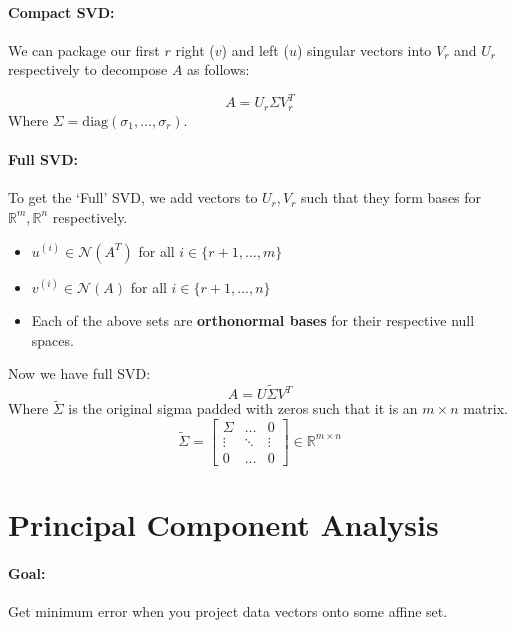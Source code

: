 \documentclass[a4paper,12pt]{report}
\def\reals{\mathbb{R}}
\begin{document}
\paragraph{Compact SVD: } We can package our first $r$ right ($v$) and left ($u$) singular vectors into $V_r$ and $U_r$ respectively to decompose $A$ as follows:

\begin{equation}
	A = U_r \Sigma V_r^T
\end{equation}
Where $\Sigma = \text{diag}(\sigma_1, ..., \sigma_r)$. 

\paragraph{Full SVD: } To get the `Full' SVD, we add vectors to $U_r, V_r$ such that they form bases for $\reals^m, \reals^n$ respectively.

\begin{itemize}
\item $u^{(i)} \in \mathcal{N}(A^T)$ for all $i \in \{r+1, ..., m\}$
\item $v^{(i)} \in \mathcal{N}(A)$ for all $i\in \{r+1, ..., n\}$
\item Each of the above sets are \textbf{orthonormal bases} for their respective null spaces.
\end{itemize}

Now we have full SVD: 
\begin{equation}
A = U\tilde{\Sigma}V^T
\end{equation}
Where $\tilde{\Sigma}$ is the original sigma padded with zeros such that it is an $m \times n$ matrix.
\begin{equation}
\tilde{\Sigma} = 
\begin{bmatrix}
\Sigma & \dots & 0 \\
\vdots & \ddots & \vdots \\
0 & \dots & 0
\end{bmatrix}
\in \reals^{m\times n}
\end{equation}

\section{Principal Component Analysis}

\paragraph{Goal: } Get minimum error when you project data vectors onto some affine set.
\end{document}
